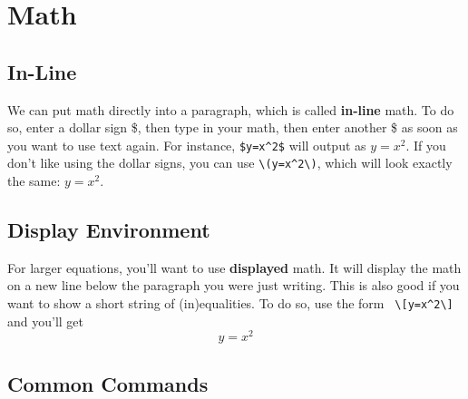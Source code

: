 \documentclass[12pt]{article}
\begin{document}
\section{Math}

\subsection{In-Line}

We can put math directly into a paragraph, which is called \textbf{in-line} math. 
To do so, enter a dollar sign \$, then type in your math, then enter another \$ as 
soon as you want to use text again. For instance, \verb|$y=x^2$|  will output as 
$y=x^2$. If you don't like using the dollar signs, you can use \verb|\(y=x^2\)|, 
which will look exactly the same: \(y=x^2\).


\subsection{Display Environment}

For larger equations, you'll want to use \textbf{displayed} math. It will display the 
math on a new line below the paragraph you were just writing. This is also good 
if you want to show a short string of (in)equalities.  To do so, use the form 
\verb| \[y=x^2\]| and you'll get
		\[y=x^2\]


\subsection{Common Commands}
\end{document}
